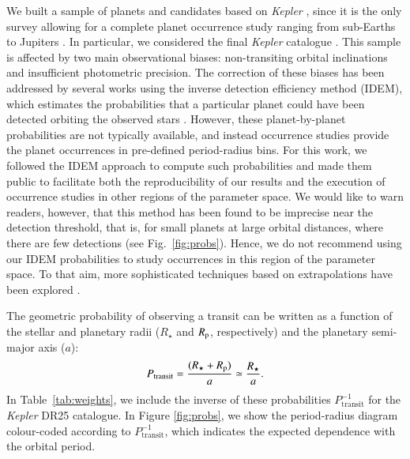 \documentclass[]{aa}
\begin{document}
We built a sample of planets and candidates based on  \textit{Kepler} \citep{2010Sci...327..977B}, since it is the only survey allowing for a complete planet occurrence study ranging from sub-Earths to Jupiters \citep[e.g.][]{2011ApJ...742...38Y}. In particular, we considered the final \textit{Kepler} catalogue \citep[DR25;][]{2018ApJS..235...38T}. This sample is affected by two main observational biases: non-transiting orbital inclinations and insufficient photometric precision. The correction of these biases has been addressed by several works using the inverse detection efficiency method (IDEM), which estimates the probabilities that a particular planet could have been detected orbiting the observed stars \citep[e.g.][]{2012ApJS..201...15H,2012ApJ...753...90M,2013ApJS..204...24B,2013ApJ...766...81F,2013ApJ...767L...8K,2013PNAS..11019273P,2015ApJ...810...95C,2015ApJ...807...45D,2015ApJ...798..112M}. However, these planet-by-planet probabilities are not typically available, and instead occurrence studies provide the planet occurrences in pre-defined period-radius bins. For this work, we followed the IDEM approach to compute such probabilities and made them public to facilitate both the reproducibility of our results and the execution of occurrence studies in other regions of the parameter space. We would like to warn readers, however, that this method has been found to be imprecise near the detection threshold, that is, for small planets at large orbital distances, where there are few detections (see Fig.~\ref{fig:probs}). Hence, we do not recommend using our IDEM probabilities to study occurrences in this region of the parameter space. To that aim, more sophisticated techniques based on extrapolations have been explored \citep[e.g.][]{2014ApJ...795...64F,2014ApJ...791...10M,2018AJ....155..205H,2020AJ....159..248K,2021AJ....161...36B}. 

The geometric probability of observing a transit can be written as a function of the stellar and planetary radii ($R_{\star}$ and $R_{\rm p}$, respectively) and the planetary semi-major axis ($a$):
\begin{equation}
    P_{\textrm{transit}} = \frac{(R_{\star} + R_{\rm p})}{a} \simeq \frac{R_{\star}}{a}.
\end{equation}
In Table~\ref{tab:weights}, we include the inverse of these probabilities $P_{\textrm{transit}}^{-1}$ for the \textit{Kepler} DR25 catalogue. In Figure \ref{fig:probs}, we show the period-radius diagram colour-coded according to $P_{\textrm{transit}}^{-1}$, which indicates the expected dependence with the orbital period. 
\end{document}
